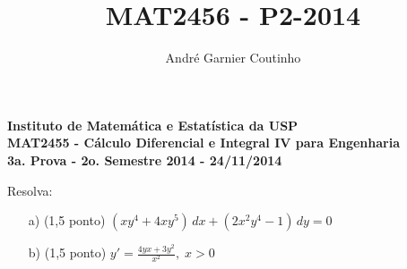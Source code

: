 \documentclass[12pt,a4paper]{article}
\title{MAT2456 - P2-2014}
\author{André Garnier Coutinho}
\begin{document}
\begin{center}
\textbf{Instituto de Matemática e Estatística da USP\\
MAT2455 - Cálculo Diferencial e Integral IV para Engenharia\\}
\textbf{3a. Prova - 2o. Semestre 2014 - 24/11/2014}
\end{center}


 Resolva:
\begin{itemize}
	\item[a)] (1,5 ponto) $(xy^4 + 4xy^5)\,dx + (2x^2 y^4 -1)\,dy = 0$
	
	\item[b)] (1,5 ponto) $y' = \displaystyle\frac{4yx + 3y^2}{x^2}, \; x>0$
\end{itemize}
\end{document}
